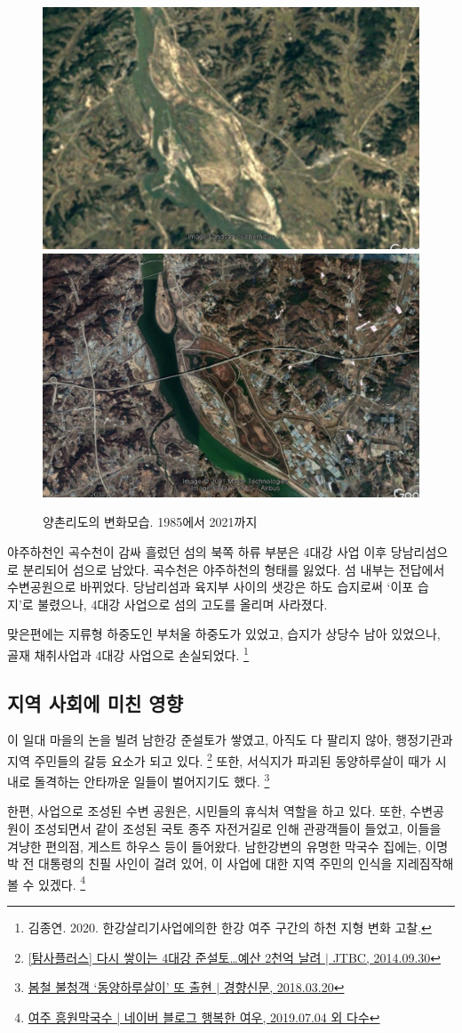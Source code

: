 \begin{figure}[ht]
    \centering
    \includegraphics[width=.45\textwidth]{img/양촌리 1985.jpg}
    \includegraphics[width=.45\textwidth]{img/양촌리 2021.jpg}
    \caption{양촌리도의 변화모습. 1985에서 2021까지 }
    \label{fig:my_labe613}
\end{figure}


야주하천인 곡수천이 감싸 흘렀던 섬의 북쪽 하류 부분은 4대강 사업 이후 당남리섬으로 분리되어 섬으로 남았다. 
곡수천은 야주하천의 형태를 잃었다. 섬 내부는 전답에서 수변공원으로 바뀌었다.
당남리섬과 육지부 사이의 샛강은 하도 습지로써 `이포 습지'로 불렸으나, 4대강 사업으로 섬의 고도를 올리며 사라졌다.

맞은편에는 지류형 하중도인 부처울 하중도가 있었고, 습지가 상당수 남아 있었으나, 골재 채취사업과 4대강 사업으로 손실되었다.
\footnote{김종연. 2020. 한강살리기사업에의한 한강 여주 구간의 하천 지형 변화 고찰.}

\subsection{지역 사회에 미친 영향}
이 일대 마을의 논을 빌려 남한강 준설토가 쌓였고,
아직도 다 팔리지 않아, 행정기관과 지역 주민들의 갈등 요소가 되고 있다.
\footnote{\href{https://news.jtbc.joins.com/article/article.aspx?news_id=NB10593178}{[탐사플러스] 다시 쌓이는 4대강 준설토…예산 2천억 날려 $|$ JTBC, 2014.09.30}}
또한, 서식지가 파괴된 동양하루살이 때가 시내로 돌격하는 안타까운 일들이 벌어지기도 했다.
\footnote{\href{http://news.khan.co.kr/kh_news/khan_art_view.html?artid=201803201448001&code=620109}{봄철 불청객 `동양하루살이' 또 출현 $|$ 경향신문, 2018.03.20}}

한편, 사업으로 조성된 수변 공원은, 시민들의 휴식처 역할을 하고 있다.
또한, 수변공원이 조성되면서 같이 조성된 국토 종주 자전거길로 인해 관광객들이 들었고,
이들을 겨냥한 편의점, 게스트 하우스 등이 들어왔다.
남한강변의 유명한 막국수 집에는, 이명박 전 대통령의 친필 사인이 걸려 있어,
이 사업에 대한 지역 주민의 인식을 지레짐작해 볼 수 있겠다.
\footnote{\href{https://blog.naver.com/lovelyiii/221577715597}{여주 흥원막국수 | 네이버 블로그 행복한 여우, 2019.07.04 외 다수}}

